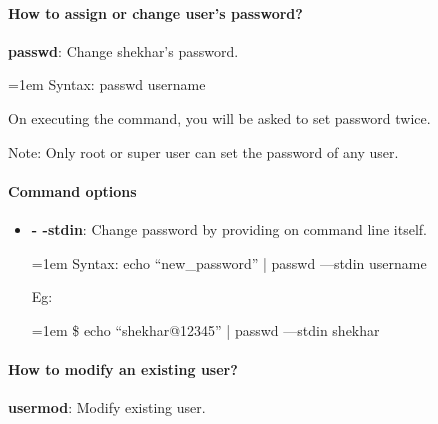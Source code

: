 \begin{flushleft}
		\bigskip
		\bigskip

\newpage

\paragraph{How to assign or change user’s password?}

\bigskip
	\textbf{passwd}: Change shekhar’s password.
	
	\begin{tcolorbox}[breakable,notitle,boxrule=0pt,colback=pink,colframe=pink]
		\color{black}
		\font=1em
		Syntax: passwd username
		\font=4pt
	\end{tcolorbox}
	On executing the command, you will be asked to set password twice.
	
	\begin{tcolorbox}[breakable,notitle,boxrule=0pt,colback=yellow,colframe=yellow]
		\color{black}
		Note: Only root or super user can set the password of any user.
	\end{tcolorbox}
	
	\paragraph{Command options}
	
	\begin{itemize}
		\item \textbf{- -stdin}: Change password by providing on command line itself.
		\begin{tcolorbox}[breakable,notitle,boxrule=0pt,colback=pink,colframe=pink]
			\color{black}
			\font=1em
			Syntax: echo “new\_password” | passwd ---stdin username
			\font=4pt
		\end{tcolorbox}
		Eg:
		\bigskip
		\begin{tcolorbox}[breakable,notitle,boxrule=-0pt,colback=black,colframe=black]
			\color{green}
			\font=1em
			\$ echo “shekhar@12345” | passwd ---stdin shekhar
			\font=4pt
		\end{tcolorbox}
	\end{itemize}
	


\newpage

\paragraph{How to modify an existing user?}
\bigskip
	\textbf{usermod}: Modify existing user.

\end{flushleft}
